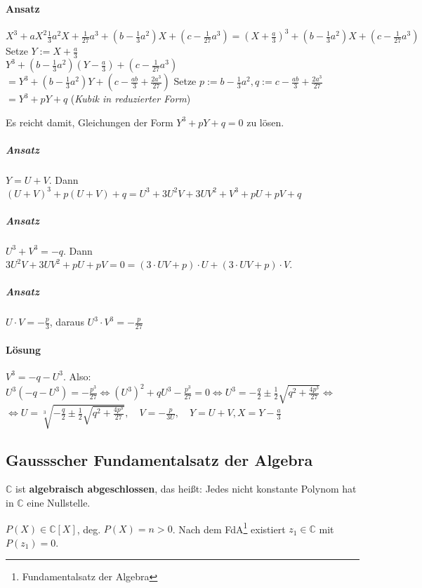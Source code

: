 \documentclass[14pt,a4paper]{article}
\newcommand{\C}{\ensuremath{\mathbb{C}}}
\begin{document}
  \paragraph{Ansatz}
  $X^3 + a X^2 \frac{1}{3} a^2 X + \frac{1}{27} a^3 + (b - \frac{1}{3}a^2)X + (c
  - \frac{1}{27}a^3) = (X + \frac{a}{3})^3 + (b - \frac{1}{3}a^2)X + (c -
  \frac{1}{27}a^3)$
  Setze $Y := X + \frac{a}{3}$\\
  
  $Y^3 + (b - \frac{1}{3}a^2)(Y - \frac{a}{3}) + (c - \frac{1}{27} a^3)$ \\
  $= Y^3 + (b- \frac{1}{3}a^2)Y + (c - \frac{ab}{3} + \frac{2a^3}{27})$
  Setze $ p:= b - \frac{1}{3}a^2, q := c - \frac{ab}{3} + \frac{2a^3}{27}$\\
  $=Y^3 + pY + q$ (\textit{Kubik in reduzierter Form})

  Es reicht damit, Gleichungen der Form $Y^3 + pY +q = 0$ zu lösen.

  \subparagraph{Ansatz}
  $ Y = U + V $.
  Dann $ (U + V)^3 + p(U + V) + q = U^3 + 3 U^2 V + 3 UV^2 + V^3 + pU + pV + q$

  \subparagraph{Ansatz}
  $U^3 + V^3 = -q $. Dann $ 3U^2V+3UV^2+pU+pV = 0 = (3 \cdot UV + p) \cdot U +
  (3 \cdot UV + p) \cdot V $.

  \subparagraph{Ansatz}
  $ U \cdot V = - \frac{p}{3}$, daraus $U^3 \cdot V^3 = -\frac{p}{27}$

  \paragraph{Lösung}
  $ V^3 = -q - U^3$. Also: $U^3(-q - U^3) = -\frac{p^3}{27} \Leftrightarrow
  (U^3)^2 + q U^3 - \frac{p^3}{27} = 0 \Leftrightarrow U^3 = - \frac{q}{2} \pm
  \frac{1}{2} \sqrt{q^2 + \frac{4 p^3}{27}}\Leftrightarrow$
  $\Leftrightarrow U = \sqrt[3]{-\frac{q}{2} \pm \frac{1}{2} \sqrt{q^2 +
      \frac{4p^3}{27}}}, \quad V = -\frac{p}{3U}, \quad Y = U + V, X = Y -
  \frac{a}{3}$

  \newpage
  \subsection{Gaussscher Fundamentalsatz der Algebra}
  $\C$ ist \textbf{algebraisch abgeschlossen}, das heißt: Jedes nicht konstante
  Polynom hat in $\C$ eine Nullstelle.

  
  $P(X) \in \C[X]$, deg.  $P(X) = n > 0$. Nach dem FdA\footnote{Fundamentalsatz
    der Algebra} existiert $z_1 \in \C$ mit $P(z_1) = 0$.
\end{document}
